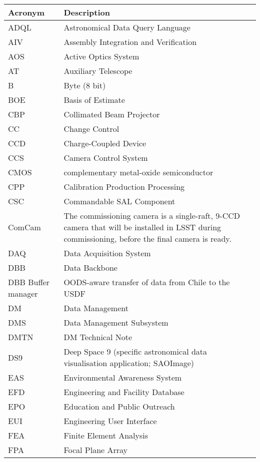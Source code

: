 \addtocounter{table}{-1}
\begin{longtable}{p{}p{}}\hline
\textbf{Acronym} & \textbf{Description}  \\\hline

ADQL & Astronomical Data Query Language \\\hline
AIV & Assembly Integration and Verification \\\hline
AOS & Active Optics System \\\hline
AT & Auxiliary Telescope \\\hline
B & Byte (8 bit) \\\hline
BOE & Basis of Estimate \\\hline
CBP & Collimated Beam Projector \\\hline
CC & Change Control \\\hline
CCD & Charge-Coupled Device \\\hline
CCS & Camera Control System \\\hline
CMOS & complementary metal-oxide semiconductor \\\hline
CPP & Calibration Production Processing \\\hline
CSC & Commandable SAL Component \\\hline
ComCam & The commissioning camera is a single-raft, 9-CCD camera that will be installed in LSST during commissioning, before the final camera is ready. \\\hline
DAQ & Data Acquisition System \\\hline
DBB & Data Backbone \\\hline
DBB Buffer manager & OODS-aware transfer of data from Chile to the USDF \\\hline
DM & Data Management \\\hline
DMS & Data Management Subsystem \\\hline
DMTN & DM Technical Note \\\hline
DS9 & Deep Space 9 (specific astronomical data visualisation application; SAOImage) \\\hline
EAS & Environmental Awareness System \\\hline
EFD & Engineering and Facility Database \\\hline
EPO & Education and Public Outreach \\\hline
EUI & Engineering User Interface \\\hline
FEA & Finite Element Analysis \\\hline
FPA & Focal Plane Array \\\hline

\end{longtable}
